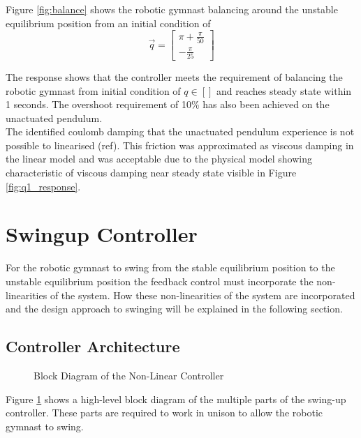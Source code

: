 Figure \ref{fig:balance} shows the robotic gymnast balancing around the unstable equilibrium position from an initial condition of $$ \vec{q} = 
\begin{bmatrix}
\pi + \frac{\pi}{50}\\
-\frac{\pi}{25}
\end{bmatrix}
$$ 

The response shows that the controller meets the requirement of balancing the robotic gymnast from initial condition of $q \in []$ and reaches steady state within 1 seconds. The overshoot requirement of 10\% has also been achieved on the unactuated pendulum.\\

The identified coulomb damping that the unactuated pendulum experience is not possible to linearised (ref). This friction was approximated as viscous damping in the linear model and was acceptable due to the physical model showing characteristic of viscous damping near steady state visible in Figure \ref{fig:q1_response}.



\section{Swingup Controller}
For the robotic gymnast to swing from the stable equilibrium position to the unstable equilibrium position the feedback control must incorporate the non-linearities of the system. How these non-linearities of the system are incorporated and the design approach to swinging will be explained in the following section.

\subsection{Controller Architecture}
\begin{figure}[h]
	\centering
	
	\caption{Block Diagram of the Non-Linear Controller}
	\label{fig:nonlinear_controller_arch}
\end{figure}

Figure \ref{fig:nonlinear_controller_arch} shows a high-level block diagram of the multiple parts of the swing-up controller. These parts are required to work in unison to allow the robotic gymnast to swing.\\

